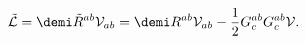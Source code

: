 \begin{equation}
\tilde {\cal L} = \demi \tilde R^{ab}{\cal V}_{ab}
= \demi R^{ab}{\cal V}_{ab} - {1\over 2} G^{ab}_c G^{ab}_c 
{\cal V}.
\label{L-tilde}
\end{equation}


